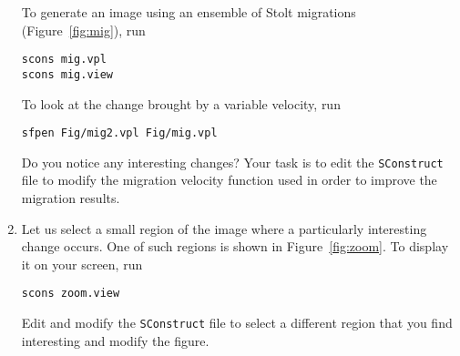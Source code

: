 \begin{enumerate}

To generate an image using an ensemble of Stolt migrations (Figure~\ref{fig:mig}), run
\begin{verbatim}
scons mig.vpl
scons mig.view
\end{verbatim}
To look at the change brought by a variable velocity, run
\begin{verbatim}
sfpen Fig/mig2.vpl Fig/mig.vpl
\end{verbatim}
Do you notice any interesting changes? Your task is to edit the \texttt{SConstruct} file to modify the migration 
velocity function used in order to improve the migration results. 
\answer{%

}


\item Let us select a small region of the image where a particularly interesting change occurs. One of such regions is 
shown in Figure~\ref{fig:zoom}. To display it on your screen, run
\begin{verbatim}
scons zoom.view
\end{verbatim}


Edit and modify the \texttt{SConstruct} file to select a different region that you find interesting and modify the figure.

\end{enumerate}



